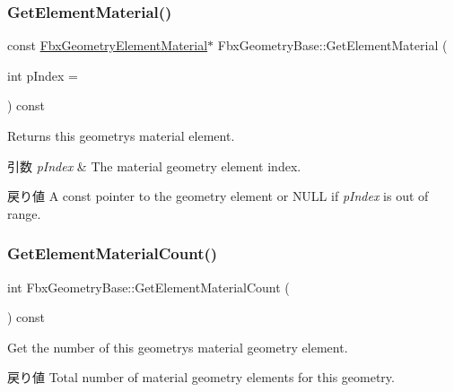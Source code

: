 \subsubsection{\texorpdfstring{Get\+Element\+Material()}{GetElementMaterial()}\hspace{0.1cm}{\footnotesize\ttfamily [2/2]}}
{\footnotesize\ttfamily const \hyperlink{fbxlayer_8h_a1a779f3f614dbf0024c07f4a1d8332f4}{Fbx\+Geometry\+Element\+Material}$\ast$ Fbx\+Geometry\+Base\+::\+Get\+Element\+Material (\begin{DoxyParamCaption}\item[{int}]{p\+Index = {} }\end{DoxyParamCaption}) const}

Returns this geometry\textquotesingle{}s material element. 
\begin{DoxyParams}{引数}
{\em p\+Index} & The material geometry element index. \\
\hline
\end{DoxyParams}
\begin{DoxyReturn}{戻り値}
A const pointer to the geometry element or {\ttfamily N\+U\+LL} if {\itshape p\+Index} is out of range. 
\end{DoxyReturn}
\mbox{\label{class_fbx_geometry_base_a443797935c203b51edb4004907613017}} 
\subsubsection{\texorpdfstring{Get\+Element\+Material\+Count()}{GetElementMaterialCount()}}
{\footnotesize\ttfamily int Fbx\+Geometry\+Base\+::\+Get\+Element\+Material\+Count (\begin{DoxyParamCaption}{ }\end{DoxyParamCaption}) const}

Get the number of this geometry\textquotesingle{}s material geometry element. \begin{DoxyReturn}{戻り値}
Total number of material geometry elements for this geometry. 
\end{DoxyReturn}
\mbox{\label{class_fbx_geometry_base_ab7486b08caa6e90923fbb194bd81a61e}} 
